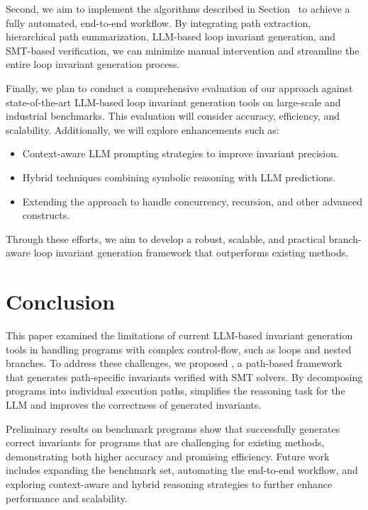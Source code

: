 \documentclass[letterpaper]{article} %
\begin{document}
Second, we aim to implement the algorithms described in Section~ to achieve a fully automated, end-to-end workflow. By integrating path extraction, hierarchical path summarization, LLM-based loop invariant generation, and SMT-based verification, we can minimize manual intervention and streamline the entire loop invariant generation process.

Finally, we plan to conduct a comprehensive evaluation of our approach against state-of-the-art LLM-based loop invariant generation tools on large-scale and industrial benchmarks. This evaluation will consider accuracy, efficiency, and scalability. Additionally, we will explore enhancements such as:
\begin{itemize}
    \item Context-aware LLM prompting strategies to improve invariant precision.
    \item Hybrid techniques combining symbolic reasoning with LLM predictions.
    \item Extending the approach to handle concurrency, recursion, and other advanced constructs.
\end{itemize}

Through these efforts, we aim to develop a robust, scalable, and practical branch-aware loop invariant generation framework that outperforms existing methods.




\section{Conclusion}

This paper examined the limitations of current LLM-based invariant generation tools in handling programs with complex control-flow, such as loops and nested branches. To address these challenges, we proposed \thistool{}, a path-based framework that generates path-specific invariants verified with SMT solvers. By decomposing programs into individual execution paths, \thistool{} simplifies the reasoning task for the LLM and improves the correctness of generated invariants.

Preliminary results on benchmark programs show that \thistool{} successfully generates correct invariants for programs that are challenging for existing methods, demonstrating both higher accuracy and promising efficiency. Future work includes expanding the benchmark set, automating the end-to-end workflow, and exploring context-aware and hybrid reasoning strategies to further enhance performance and scalability.









\end{document}
